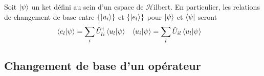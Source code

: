 \documentclass[../notesdecours.tex]{subfiles}
\begin{document}
\begin{Property}
	Soit $\ket{\psi}$ un ket défini au sein d'un espace de $\mathcal{H}$ilbert. En particulier, les relations de changement de base entre $\left\{\ket{u_i}\right\}$ et $\left\{\ket{e_l}\right\}$ pour $\ket{\psi}$ et $\bra{\psi}$ seront
	\begin{align}
		\braket{e_l|\psi} &= \sum_i \hat{U}^\dagger_{li} \braket{u_l|\psi} & \braket{u_i|\psi} &= \sum_l \hat{U}_{il} \braket{u_l|\psi} 
	\end{align}
\end{Property}

\subsection{Changement de base d'un opérateur}
\end{document}
